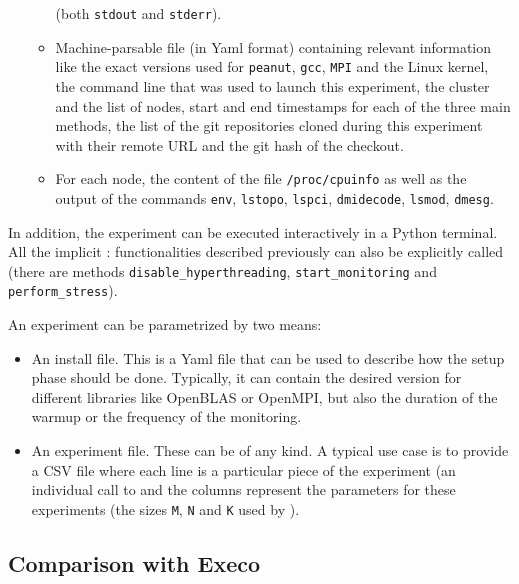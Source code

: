 \begin{itemize}
\begin{itemize}
                            (both \texttt{stdout} and \texttt{stderr}).
                        \item Machine-parsable file (in Yaml format) containing relevant information like
                            the exact versions used for \texttt{peanut}, \texttt{gcc}, \texttt{MPI} and the Linux
                            kernel, the command line that was used to launch this experiment, the cluster and the list
                            of nodes, start and end timestamps for each of the three main methods, the list of the git
                            repositories cloned during this experiment with their remote URL and the git hash of the
                            checkout.
                        \item For each node, the content of the file \texttt{/proc/cpuinfo} as well as the output of the
                            commands \texttt{env}, \texttt{lstopo}, \texttt{lspci}, \texttt{dmidecode},
                            \texttt{lsmod}, \texttt{dmesg}.
                    \end{itemize}
            \end{itemize}
            In addition, the experiment can be executed interactively in a Python terminal. All the implicit
            : functionalities described previously can also be explicitly called (\eg there are methods
            \texttt{disable\_hyperthreading}, \texttt{start\_monitoring} and \texttt{perform\_stress}).

            An experiment can be parametrized by two means:
            \begin{itemize}
                \item An install file. This is a Yaml file that can be used to describe how the setup phase should be
                    done. Typically, it can contain the desired version for different libraries like OpenBLAS or
                    OpenMPI, but also the duration of the warmup or the frequency of the monitoring.
                \item An experiment file. These can be of any kind. A typical use case is to provide a CSV file where
                    each line is a particular piece of the experiment (\eg an individual call to \dgemm and the
                    columns represent the parameters for these experiments (\eg the sizes \texttt{M}, \texttt{N} and
                    \texttt{K} used by \dgemm).
            \end{itemize}

        \subsection{Comparison with Execo}%
        \label{sub:comparison_with_execo}

